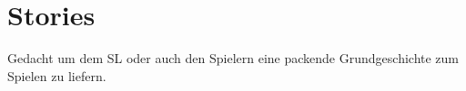 {\let\clearpage\relax\chapter{Stories}}
Gedacht um dem SL oder auch den Spielern eine packende Grundgeschichte zum Spielen zu liefern. \\